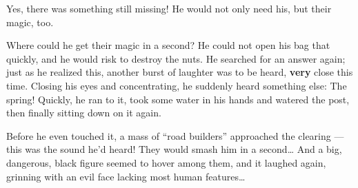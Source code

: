 Yes, there was something still missing! He would not only need his, but their magic, too.

Where could he get their magic in a second? He could not open his bag that quickly, and he would risk to destroy the nuts. He searched for an answer again; just as he realized this, another burst of laughter was to be heard, \textbf{very} close this time. 
Closing his eyes and concentrating, he suddenly heard something else: The spring! Quickly, he ran to it, took some water in his hands and watered the post, then finally sitting down on it again.

Before he even touched it, a mass of \enquote{road builders} approached the clearing --- this was the sound he'd heard! They would smash him in a second\dots
And a big, dangerous, black figure seemed to hover among them, and it laughed again, grinning with an evil face lacking most human features\dots
